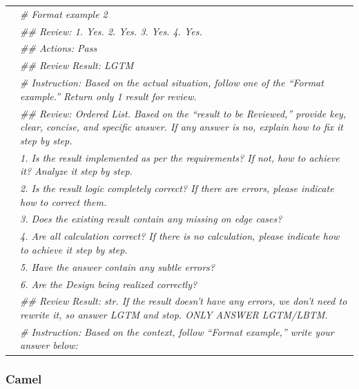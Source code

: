 \documentclass{article}
\theoremstyle{plain}
\theoremstyle{definition}
\theoremstyle{remark}
\begin{document}
\begin{table}[h!]
{\begin{tabular}{lp{15cm}}
    & \em \# Format example 2 \\
    & \em \#\# Review: 1. Yes. 2. Yes. 3. Yes. 4. Yes. \\
    & \em \#\# Actions: Pass \\
    & \em \#\# Review Result: LGTM \\
    & \em \# Instruction: Based on the actual situation, follow one of the ``Format example.'' Return only 1 result for review. \\
    & \em \#\# Review: Ordered List. Based on the ``result to be Reviewed,'' provide key, clear, concise, and specific answer. If any answer is no, explain how to fix it step by step. \\
    & \em 1. Is the result implemented as per the requirements? If not, how to achieve it? Analyze it step by step. \\
    & \em 2. Is the result logic completely correct? If there are errors, please indicate how to correct them. \\
    & \em 3. Does the existing result contain any missing on edge cases? \\
    & \em 4. Are all calculation correct? If there is no calculation, please indicate how to achieve it step by step. \\
    & \em 5. Have the answer contain any subtle errors? \\
    & \em 6. Are the Design being realized correctly? \\
    & \em \#\# Review Result: str. If the result doesn't have any errors, we don't need to rewrite it, so answer LGTM and stop. ONLY ANSWER LGTM/LBTM. \\
    & \em \# Instruction: Based on the context, follow ``Format example,'' write your answer below: \\
    \bottomrule
    \end{tabular}
    }
\end{table}

\subsubsection{Camel}
\end{document}
